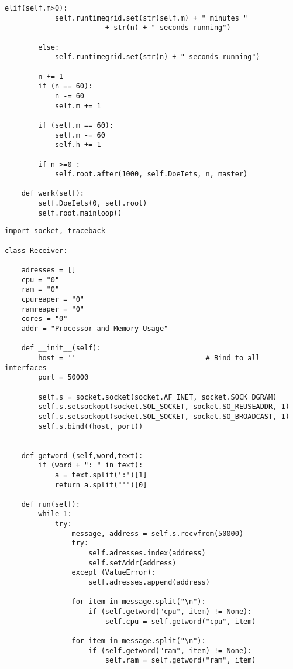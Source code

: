 \documentclass[DIV=calc]{scrartcl}
\begin{document}
\begin{lstlisting}[caption={pyhtonUI.py}, label=UI van het processor- en geheugengebruik van de server]
        elif(self.m>0):
            self.runtimegrid.set(str(self.m) + " minutes " 
						+ str(n) + " seconds running")
 
        else:
            self.runtimegrid.set(str(n) + " seconds running")
 
        n += 1
        if (n == 60):
            n -= 60
            self.m += 1
 
        if (self.m == 60):
            self.m -= 60
            self.h += 1
 
        if n >=0 :
            self.root.after(1000, self.DoeIets, n, master)
 
    def werk(self):       
        self.DoeIets(0, self.root)
        self.root.mainloop()
\end{lstlisting}
\begin{lstlisting}[caption={broadcast\_recieve.py}, label=luister op poort en ontvangt data]
import socket, traceback
  
class Receiver:
 
    adresses = []
    cpu = "0"
    ram = "0"
    cpureaper = "0"
    ramreaper = "0"
    cores = "0"
    addr = "Processor and Memory Usage"
 
    def __init__(self):
        host = ''                               # Bind to all interfaces
        port = 50000
 
        self.s = socket.socket(socket.AF_INET, socket.SOCK_DGRAM)
        self.s.setsockopt(socket.SOL_SOCKET, socket.SO_REUSEADDR, 1)
        self.s.setsockopt(socket.SOL_SOCKET, socket.SO_BROADCAST, 1)
        self.s.bind((host, port))
 
 
    def getword (self,word,text):
        if (word + ": " in text):
            a = text.split(':')[1]
            return a.split("'")[0]
  
    def run(self):
        while 1:
            try:
                message, address = self.s.recvfrom(50000)
                try:
                    self.adresses.index(address)
                    self.setAddr(address)                        
                except (ValueError):
                    self.adresses.append(address)
 
                for item in message.split("\n"):
                    if (self.getword("cpu", item) != None):
                        self.cpu = self.getword("cpu", item)
 
                for item in message.split("\n"):
                    if (self.getword("ram", item) != None):
                        self.ram = self.getword("ram", item)
 

\end{lstlisting}
\end{document}
